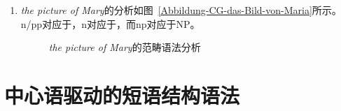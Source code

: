 \begin{enumerate}
\item \emph{the picture of Mary}的分析如图~\vref{Abbildung-CG-das-Bild-von-Maria}所示。n/pp对应于\nnull，n对应于\nbar ，而np对应于NP。
\begin{figure}[H]
\centerline{%
}
\caption{\emph{the picture of Mary}\label{Abbildung-CG-das-Bild-von-Maria}的范畴语法分析}
\end{figure}%
\end{enumerate}

\pagebreak

\section{中心语驱动的短语结构语法}

